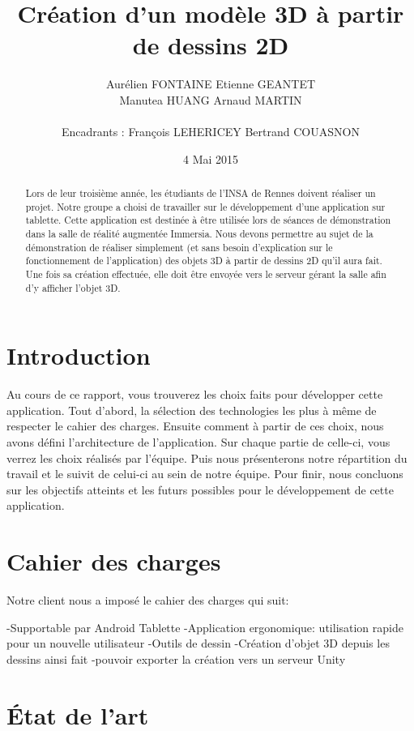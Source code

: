 \documentclass[a4paper,11pt]{article}
\title{ \textbf{Création d'un modèle 3D à partir de dessins 2D} }
\author{ Aurélien \textsc{FONTAINE} Etienne \textsc{GEANTET} \\
	Manutea \textsc{HUANG} Arnaud \textsc{MARTIN} \\
	\\
	Encadrants : François \textsc{LEHERICEY}	Bertrand \textsc{COUASNON}}
\date{4 Mai 2015}                    %
\begin{document}
\maketitle                 %
\thispagestyle{empty}      %

\begin{abstract}
	Lors de leur troisième année, les étudiants de l'INSA de Rennes doivent réaliser un projet. Notre groupe a choisi de travailler sur le développement d'une application sur tablette. Cette application est destinée à être utilisée lors de séances de démonstration dans la salle de réalité augmentée Immersia. Nous devons permettre au sujet de la démonstration de réaliser simplement (et sans besoin d'explication sur le fonctionnement de l'application) des objets 3D à partir de dessins 2D qu'il aura fait. Une fois sa création effectuée, elle doit être envoyée vers le serveur gérant la salle afin d'y afficher l'objet 3D.
\end{abstract}
	
	\section{Introduction}
		Au cours de ce rapport, vous trouverez les choix faits pour développer cette application. Tout d'abord, la sélection des technologies les plus à même de respecter le cahier des charges. Ensuite comment à partir de ces choix, nous avons défini l'architecture de l'application. Sur chaque partie de celle-ci, vous verrez les choix réalisés par l'équipe. Puis nous présenterons notre répartition du travail et le suivit de celui-ci au sein de notre équipe. Pour finir, nous concluons sur les objectifs atteints et les futurs possibles pour le développement de cette application.
	\section{Cahier des charges}
		Notre client nous a imposé le cahier des charges qui suit:
		
		-Supportable par Android Tablette
		-Application ergonomique: utilisation rapide pour un nouvelle utilisateur
		-Outils de dessin
		-Création d'objet 3D depuis les dessins ainsi fait
		-pouvoir exporter la création vers un serveur Unity
	\section{État de l'art}
\end{document}
